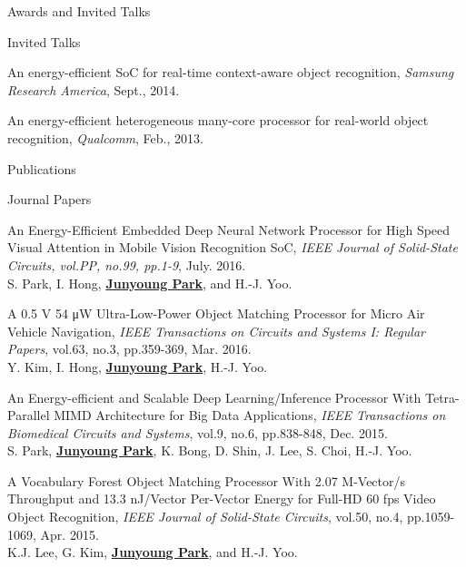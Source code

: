 \documentclass{resume} %
\begin{document}
\begin{section}{Awards and Invited Talks}
\begin{subsection}{Invited Talks}{}{}{}
\item An energy-efficient SoC for real-time context-aware object recognition,
{\small\textit{Samsung Research America}, Sept., 2014.}

\item An energy-efficient heterogeneous many-core processor for real-world object recognition,
{\small\textit{Qualcomm}, Feb., 2013.}

\end{subsection}

\end{section}



\begin{section}{Publications}

\begin{subsection}{Journal Papers}{}{}{}

\item An Energy-Efficient Embedded Deep Neural Network Processor for High Speed Visual Attention in Mobile Vision Recognition SoC,
\emph{IEEE Journal of Solid-State Circuits, vol.PP, no.99, pp.1-9}, July. 2016. \\
{\small S. Park, I. Hong, \underline{\bf Junyoung Park}, and H.-J. Yoo.}

\item A 0.5 V 54 μW Ultra-Low-Power Object Matching Processor for Micro Air Vehicle Navigation,
\emph{IEEE Transactions on Circuits and Systems I: Regular Papers}, vol.63, no.3, pp.359-369, Mar. 2016. \\
{\small Y. Kim, I. Hong, \underline{\bf Junyoung Park}, H.-J. Yoo.}

\item An Energy-efficient and Scalable Deep Learning/Inference Processor With Tetra-Parallel MIMD Architecture for Big Data Applications,
\emph{IEEE Transactions on Biomedical Circuits and Systems}, vol.9, no.6, pp.838-848, Dec. 2015. \\
{\small S. Park, \underline{\bf Junyoung Park}, K. Bong, D. Shin, J. Lee, S. Choi, H.-J. Yoo.}

\item A Vocabulary Forest Object Matching Processor With 2.07 M-Vector/s Throughput and 13.3 nJ/Vector Per-Vector Energy for Full-HD 60 fps Video Object Recognition, \emph{IEEE Journal of Solid-State Circuits}, vol.50, no.4, pp.1059-1069, Apr. 2015. \\
{\small K.J. Lee, G. Kim, \underline{\bf Junyoung Park}, and H.-J. Yoo.}


\end{subsection}
\end{section}
\end{document}
